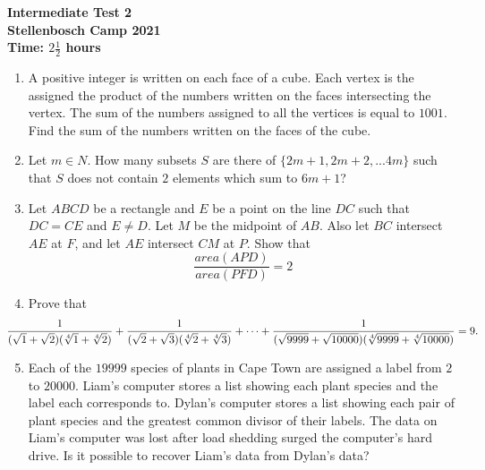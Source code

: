 \documentclass{article}
\begin{document}
\thispagestyle{empty}

\begin{center}
  \textbf{\Large Intermediate Test 2}
  \\ \vspace{1em}
  \textbf{\large Stellenbosch Camp 2021}
  \\ \vspace{1em}
  \textbf{\large Time: $2\frac{1}{2}$ hours}
\end{center}

\bigskip

\begin{enumerate}[itemsep=\fill]


\item %
A positive integer is written on each face of a cube. Each vertex is the assigned the product of the numbers written on the faces intersecting the vertex. The sum of the numbers assigned to all the vertices is equal to $1001$. Find the sum of the numbers written on the faces of the cube.

\item %
Let $m \in {N}$. How many subsets $S$ are there of $\{2m+1,2m+2,...4m\}$ such that $S$ does not contain $2$ elements which sum to $6m+1$? 

\item %
Let $ABCD$ be a rectangle and $E$ be a point on the line $DC$ such that $DC = CE$ and $E \neq D$.  Let $M$ be the midpoint of $AB$.  Also let $BC$ intersect $AE$ at $F$, and let $AE$ intersect $CM$ at $P$.  Show that $$\frac{area(APD)}{area(PFD)} = 2$$

\item %
Prove that
\[ \mspace{-36mu} \frac{1}{(\sqrt{1}+\sqrt{2})(\sqrt[4]{1}+\sqrt[4]{2})} +\frac{1}{(\sqrt{2}+\sqrt{3})(\sqrt[4]{2}+\sqrt[4]{3})} +\dotsb +\frac{1}{(\sqrt{9999}+\sqrt{10000})(\sqrt[4]{9999}+\sqrt[4]{10000})} = 9. \]

\item %
Each of the $19 999$ species of plants in Cape Town are assigned a label from $2$ to $20 000$. Liam's computer stores a list showing each plant species and the label each corresponds to. Dylan's computer stores a list showing each pair of plant species and the greatest common divisor of their labels. The data on Liam's computer was lost after load shedding surged the computer's hard drive. Is it possible to recover Liam's data from Dylan's data?

\end{enumerate}
\end{document}

